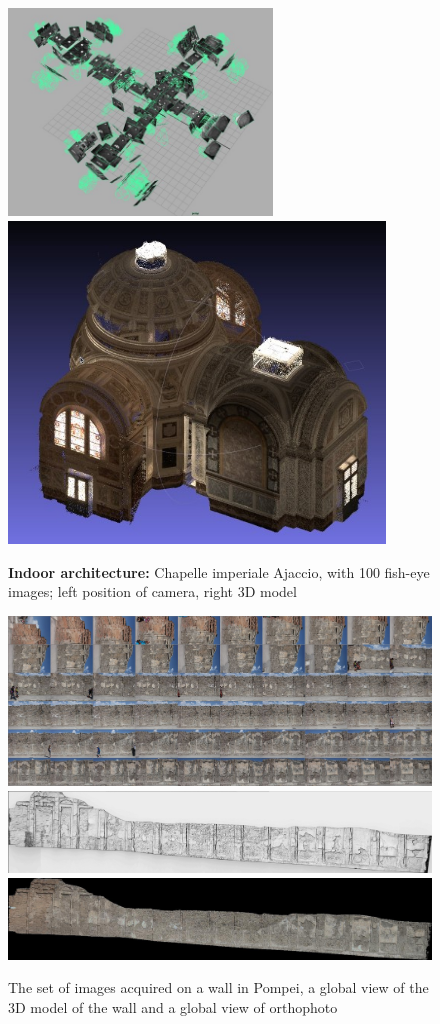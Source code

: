 \begin{figure}
\includegraphics[width=70mm]{FIGS/SAMPLES/Aj2.jpg}
\includegraphics[width=100mm]{FIGS/SAMPLES/Aj1.jpg}
\caption{{\bf Indoor architecture: } Chapelle imperiale Ajaccio, with 100 fish-eye images;
left position of camera, right 3D model}
\end{figure}



\begin{figure}
\includegraphics[width=160mm]{FIGS/SAMPLES/Pompei-Planche.jpg}
\includegraphics[width=160mm]{FIGS/SAMPLES/Pompei-Shade2.jpg}
\includegraphics[width=160mm]{FIGS/SAMPLES/Pompei-Ortho1.jpg}
\caption{The set of images acquired on a wall in Pompei, a global
view of the 3D model of the wall and a global view of orthophoto}
\end{figure}

